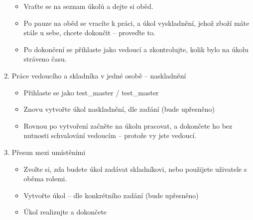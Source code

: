 \begin{enumerate}
\begin{itemize}
		\item Vraťte se na seznam úkolů a dejte si oběd.
		\item Po pauze na oběd se vracíte k práci, a úkol vyskladnění, jehož zboží máte stále u sebe, chcete dokončit – proveďte to.
		\item Po dokončení se přihlaste jako vedoucí a zkontrolujte, kolik bylo na úkolu stráveno času.
	\end{itemize}
	\item Práce vedoucího a skladníka v jedné osobě – naskladnění
	\begin{itemize}
		\item Přihlaste se jako test\_master / test\_master
		\item Znovu vytvořte úkol naskladnění, dle zadání (bude upřesněno)
		\item Rovnou po vytvoření začněte na úkolu pracovat, a dokončete ho bez nutnosti schvalování vedoucím – protože vy jste vedoucí.
	\end{itemize}
	\item Přesun mezi umístěními
	\begin{itemize}
		\item Zvolte si, zda budete úkol zadávat skladníkovi, nebo použijete uživatele s oběma rolemi.
		\item Vytvořte úkol  – dle konkrétního zadání (bude upřesněno)
		\item Úkol realizujte a dokončete
	\end{itemize}
\end{enumerate}
